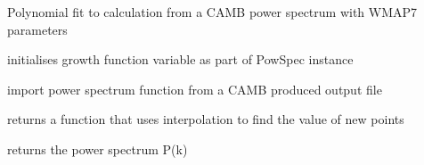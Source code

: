 \documentclass[letterpaper,10pt,english]{sphinxmanual}
\begin{document}
\begin{fulllineitems}
\begin{fulllineitems}
Polynomial fit to calculation from a CAMB power spectrum 
with WMAP7 parameters

\end{fulllineitems}


\begin{fulllineitems}
\label{PyCosmo:PyCosmo.powspec.PowSpec.growth_func}
initialises growth function variable
as part of PowSpec instance

\end{fulllineitems}


\begin{fulllineitems}
\label{PyCosmo:PyCosmo.powspec.PowSpec.import_powerspectrum}
import power spectrum function from
a CAMB produced output file

\end{fulllineitems}


\begin{fulllineitems}
\label{PyCosmo:PyCosmo.powspec.PowSpec.interpolate}
returns a function that uses interpolation
to find the value of new points

\end{fulllineitems}


\begin{fulllineitems}
\label{PyCosmo:PyCosmo.powspec.PowSpec.power_spectrum_P}
returns the power spectrum P(k)

\end{fulllineitems}


\begin{fulllineitems}
\label{PyCosmo:PyCosmo.powspec.PowSpec.sigma_fit}
\end{fulllineitems}


\end{fulllineitems}
\end{document}
